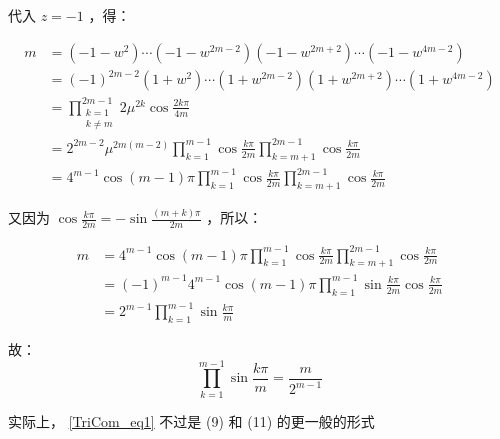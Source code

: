 代入 $z=-1$ ，得：

$$\begin{aligned} m&=(-1-w^2)\cdots(-1-w^{2m-2})(-1-w^{2m+2})\cdots(-1-w^{4m-2})\\ &=(-1)^{2m-2}(1+w^2)\cdots(1+w^{2m-2})(1+w^{2m+2})\cdots(1+w^{4m-2})\\ &=\prod_{\substack{k=1\\k\neq m}}^{2m-1}2\mu^{2k}\cos\frac{2k\pi}{4m}\\ &=2^{2m-2}\mu^{2m(m-2)}\prod_{k=1}^{m-1}\cos\frac{k\pi}{2m}\prod_{k=m+1}^{2m-1}\cos\frac{k\pi}{2m}\\ &=4^{m-1}\cos(m-1)\pi\prod_{k=1}^{m-1}\cos\frac{k\pi}{2m}\prod_{k=m+1}^{2m-1}\cos\frac{k\pi}{2m}  \end{aligned}$$

又因为 $\displaystyle{\cos\frac{k\pi}{2m}=-\sin\frac{(m+k)\pi}{2m}}$ ，所以：

$$\begin{aligned} m&=4^{m-1}\cos(m-1)\pi\prod_{k=1}^{m-1}\cos\frac{k\pi}{2m}\prod_{k=m+1}^{2m-1}\cos\frac{k\pi}{2m}\\ &=(-1)^{m-1}4^{m-1}\cos(m-1)\pi\prod_{k=1}^{m-1}\sin\frac{k\pi}{2m}\cos\frac{k\pi}{2m}\\ &=2^{m-1}\prod_{k=1}^{m-1}\sin\frac{k\pi}{m} \end{aligned}$$

故：
\begin{equation}\label{TriCom_eq1}%
\prod_{k=1}^{m-1}\sin\frac{k\pi}{m}=\frac{m}{2^{m-1}}
\end{equation}

实际上， \autoref{TriCom_eq1}  不过是 (9) 和 (11) 的更一般的形式
